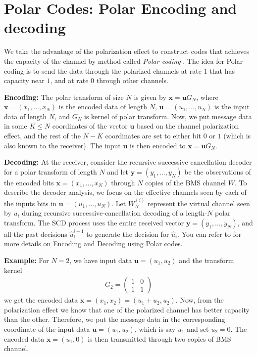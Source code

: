 \documentclass[a4paper,11pt]{article}
\begin{document}
\section{Polar Codes: Polar Encoding and decoding}

We take the advantage of the polarization effect to construct codes that achieves the capacity of the channel by method called \textit{Polar coding} \cite{arikan}. The idea for Polar coding is to send the data through the polarized channels at rate 1 that has capacity near $1$, and at rate $0$ through other channels.

\textbf{Encoding:} The polar transform of size $N$ is given by $\mathbf x=\mathbf u G_N$, where $\mathbf x = (x_1,\dots,x_N)$ is the encoded data of length $N$, $\mathbf u = (u_1,\dots, u_N )$ is the input data of length $N$, and $G_N$ is kernel of polar transform. Now, we put message data in some $K\leq N$ coordinates of the vector $\mathbf u$ based on the channel polarization effect, and the rest of the $N-K$ coordinates are set to either bit $0$ or $1$ (which is also known to the receiver). The input $\mathbf u$ is then encoded to $\mathbf x = \mathbf u G_N$.

\textbf{Decoding:} At the receiver, consider the recursive successive cancellation decoder for a polar transform of length $N$ and let $\mathbf y = (y_1,\dots, y_N)$ be the observations of the encoded bits $\mathbf x = (x_1,\dots, x_N)$ through $N$ copies of the BMS channel $W$. To describe the decoder analysis, we focus on the effective channels seen by each of the inputs bits in $\mathbf u = (u_1,\dots, u_N )$. Let $W_N^{(i)}$ represent the virtual channel seen by $u_i$ during recursive successive-cancellation decoding of a length-$N$ polar transform. The SCD process uses the entire received vector $\mathbf y = (y_1,\dots,y_N)$, and all the past decisions $\hat u_1^{i-1}$ to generate the decision for $\hat u_i$. You can refer to \cite{arikan,Pfister} for more details on Encoding and Decoding using Polar codes.

\textbf{Example:} For $N=2$, we have input data $\mathbf u = (u_1,u_2)$ and the transform kernel
\begin{align}
G_2 = \begin{pmatrix}
1 & 0\\
1 & 1
\end{pmatrix}
\end{align}
we get the encoded data $\mathbf x = (x_1,x_2) = (u_1+u_2,u_2)$. Now, from the polarization effect we know that one of the polarized channel has better capacity than the other. Therefore, we put the message data in the corresponding coordinate of the input data $\mathbf u = (u_1,u_2)$, which is say $u_1$ and set $u_2 = 0$. The encoded data $\mathbf x = (u_1,0)$ is then transmitted through two copies of BMS channel.
\end{document}
